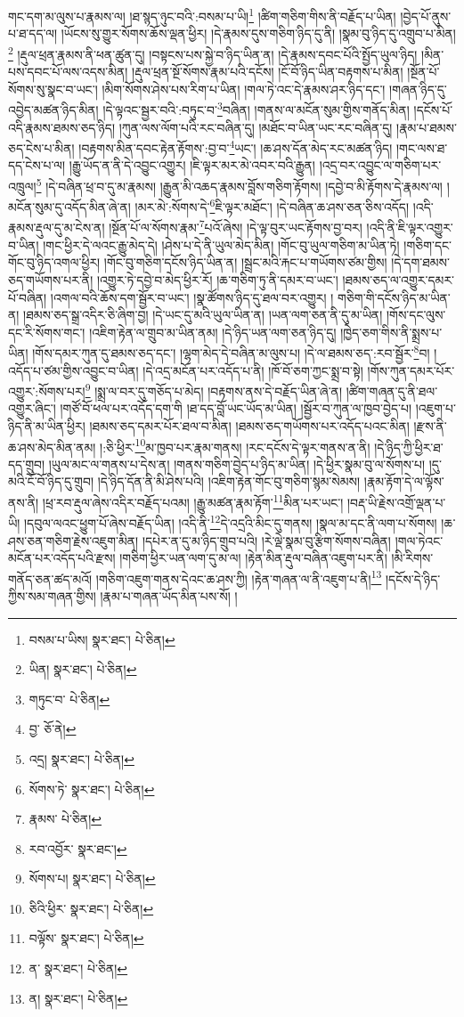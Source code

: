 གང་དག་མ་ལུས་པ་རྣམས་ལ། །ཐ་སྙད་ཉུང་བའི་:བསམ་པ་ཡི།\footnote{བསམ་པ་ཡིས།  སྣར་ཐང་།  པེ་ཅིན། } །ཚིག་གཅིག་གིས་ནི་བརྗོད་པ་ཡིན། །བྱེད་པོ་ནུས་པ་ཐ་དད་ལ། །ཡོངས་སུ་གྱུར་སོགས་ཆོས་ལྡན་ཕྱིར། །དེ་རྣམས་དུས་གཅིག་ཉིད་དུ་ནི། །སྣམ་བུ་ཉིད་དུ་འགྲུབ་པ་མིན།\footnote{ཡིན།  སྣར་ཐང་།  པེ་ཅིན། } །རྡུལ་ཕྲན་རྣམས་ནི་ཕན་ཚུན་དུ། །བསྟངས་པས་སྐྱེ་བ་ཉིད་ཡིན་ན། །དེ་རྣམས་དབང་པོའི་སྤྱོད་ཡུལ་ཉིད། །མིན་པས་དབང་པོ་ལས་འདས་མིན། །རྡུལ་ཕྲན་སྔོ་སོགས་རྣམ་པའི་དངོས། །ངོ་བོ་ཉིད་ཡིན་བརྟགས་པ་མིན། །སྔོན་པོ་སོགས་སུ་སྣང་བ་ཡང་། །མིག་སོགས་ཤེས་པས་རིག་པ་ཡིན། །གལ་ཏེ་འང་དེ་རྣམས་ཤར་ཉིད་དང་། །གཞན་ཉིད་དུ་འབྱེད་མཚན་ཉིད་མིན། །དེ་ལྟའང་སྦྱར་བའི་:བཏུང་བ་\footnote{གཏུང་བ་  པེ་ཅིན། }བཞིན། །གནས་ལ་མངོན་སུམ་གྱིས་གནོད་མིན། །དངོས་པོ་འདི་རྣམས་ཐམས་ཅད་ཉིད། །ཀུན་ལས་ལོག་པའི་རང་བཞིན་དུ། །མཐོང་བ་ཡིན་ཡང་རང་བཞིན་དུ། །རྣམ་པ་ཐམས་ཅད་ངེས་པ་མིན། །བརྟགས་མིན་དབང་རྟེན་རྟོགས་:བྱ་བ་\footnote{བྱ་  ཅོ་ནེ། }ཡང་། །ཆ་ཤས་དོན་མེད་རང་མཚན་ཉིད། །གང་ལས་ཐ་དད་ངེས་པ་ལ། །རྒྱུ་ཡོད་ན་ནི་དེ་འབྱུང་འགྱུར། །ཇི་ལྟར་མར་མེ་འབར་བའི་རྒྱུན། །འདྲ་བར་འབྱུང་ལ་གཅིག་པར་འཁྲུལ།\footnote{འདྲ།  སྣར་ཐང་།  པེ་ཅིན། } །དེ་བཞིན་ཕྲ་བ་དུ་མ་རྣམས། །རྒྱུན་མི་འཆད་རྣམས་བློས་གཅིག་རྟོགས། །དབྱེ་བ་མི་རྟོགས་དེ་རྣམས་ལ། །མངོན་སུམ་དུ་འདོད་མིན་ཞེ་ན། །མར་མེ་:སོགས་དེ་\footnote{སོགས་ཏེ་  སྣར་ཐང་།  པེ་ཅིན། }ཇི་ལྟར་མཐོང་། །དེ་བཞིན་ཆ་ཤས་ཅན་ཅིས་འདོད། །འདི་རྣམས་རྡུལ་དུ་མ་ངེས་ན། །སྔོན་པོ་ལ་སོགས་རྣམ་\footnote{རྣམས་  པེ་ཅིན། }པའོ་ཞེས། །དེ་ལྟ་བུར་ཡང་རྟོགས་བྱ་བར། །འདི་ནི་ཇི་ལྟར་འགྱུར་བ་ཡིན། །གང་ཕྱིར་དེ་ལའང་རྒྱུ་མེད་དེ། །ཤེས་པ་དེ་ནི་ཡུལ་མེད་མིན། །གོང་བུ་ཡུལ་གཅིག་མ་ཡིན་ཏེ། །གཅིག་དང་གོང་བུ་ཉིད་འགལ་ཕྱིར། །གོང་བུ་གཅིག་དངོས་ཉིད་ཡིན་ན། །སྦྲང་མའི་རྐང་པ་གཡོགས་ཙམ་གྱིས། །དེ་དག་ཐམས་ཅད་གཡོགས་པར་ནི། །འགྱུར་ཏེ་དབྱེ་བ་མེད་ཕྱིར་རོ། །ཆ་གཅིག་ཏུ་ནི་དམར་བ་ཡང་། །ཐམས་ཅད་ལ་འགྱུར་དམར་པོ་བཞིན། །འགལ་བའི་ཆོས་དག་སྦྱོར་བ་ཡང་། །སྣ་ཚོགས་ཉིད་དུ་ཐལ་བར་འགྱུར། །
གཅིག་གི་དངོས་ཉིད་མ་ཡིན་ན། །ཐམས་ཅད་སྒྲ་འདིར་ཅི་ཞིག་བྱ། །དེ་ཡང་དུ་མའི་ཡུལ་ཡིན་ན། །ཡན་ལག་ཅན་ནི་དུ་མ་ཡིན། །གོས་དང་ལུས་དང་རི་སོགས་གང་། །འཇིག་རྟེན་ལ་གྲུབ་མ་ཡིན་ནམ། །དེ་ཉིད་ཡན་ལག་ཅན་ཉིད་དུ། །ཁྱེད་ཅག་གིས་ནི་སྨྲས་པ་ཡིན། །གོས་དམར་ཀུན་དུ་ཐམས་ཅད་དང་། །ལྷག་མེད་དེ་བཞིན་མ་ལུས་པ། །དེ་ལ་ཐམས་ཅད་:རབ་སྦྱོར་\footnote{རབ་འབྱོར་  སྣར་ཐང་། }བ། །འདོད་པ་ཙམ་གྱིས་འབྱུང་བ་ཡིན། །དེ་འདྲ་མངོན་པར་འདོད་པ་ནི། །ཁོ་བོ་ཅག་ཀྱང་སྨྲ་བ་སྟེ། །གོས་ཀུན་དམར་པོར་འགྱུར་:སོགས་པར།\footnote{སོགས་པ།  སྣར་ཐང་།  པེ་ཅིན། } །སྨྲ་ལ་བར་དུ་གཅོད་པ་མེད། །བརྟགས་ནས་དེ་བརྗོད་ཡིན་ཞེ་ན། །ཚིག་གཞན་དུ་ནི་ཐལ་འགྱུར་ཞིང་། །གཙོ་བོ་ཕལ་པར་འདོད་དག་གི །ཐ་དད་བློ་ཡང་ཡོད་མ་ཡིན། །སྦྱོར་བ་ཀུན་ལ་ཁྱབ་བྱེད་པ། །འཇུག་པ་ཉིད་ནི་མ་ཡིན་ཕྱིར། །ཐམས་ཅད་དམར་པོར་ཐལ་བ་མིན། །ཐམས་ཅད་གཡོགས་པར་འདོད་པའང་མིན། །རྫས་ནི་ཆ་ཤས་མེད་མིན་ནམ། །:ཅི་ཕྱིར་\footnote{ཅིའི་ཕྱིར་  སྣར་ཐང་།  པེ་ཅིན། }མ་ཁྱབ་པར་རྣམ་གནས། །རང་དངོས་དེ་ལྟར་གནས་ན་ནི། །དེ་ཉིད་ཀྱི་ཕྱིར་ཐ་དད་གྲུབ། །ཡུལ་མང་ལ་གནས་པ་དེས་ན། །གནས་གཅིག་བྱེད་པ་ཉིད་མ་ཡིན། །དེ་ཕྱིར་སྣམ་བུ་ལ་སོགས་པ། །དུ་མའི་ངོ་བོ་ཉིད་དུ་གྲུབ། །དེ་ཉིད་དོན་ནི་མི་ཤེས་པའི། །འཇིག་རྟེན་གོང་བུ་གཅིག་སྙམ་སེམས། །རྣམ་རྟོག་དེ་ལ་ལྟོས་ནས་ནི། །ཕྲ་རབ་རྡུལ་ཞེས་འདིར་བརྗོད་པའམ། །རྒྱུ་མཚན་རྣམ་རྟོག་\footnote{བལྟོས་  སྣར་ཐང་།  པེ་ཅིན། }མིན་པར་ཡང་། །བརྡ་ཡི་རྗེས་འགྲོ་ལྡན་པ་ཡི། །དབུལ་ལའང་ཕྱུག་པོ་ཞེས་བརྗོད་ཡིན། །འདི་ནི་\footnote{ན་  སྣར་ཐང་།  པེ་ཅིན། }དེ་འདྲའི་མིང་དུ་གནས། །སྣལ་མ་དང་ནི་ལག་པ་སོགས། །ཆ་ཤས་ཅན་གཅིག་རྗེས་འཇུག་མིན། །དཔེར་ན་དུ་མ་ཉིད་གྲུབ་པའི། །རེ་ལྡེ་སྣམ་བུ་རྩིག་སོགས་བཞིན། །གལ་ཏེའང་མངོན་པར་འདོད་པའི་རྫས། །གཅིག་ཕྱིར་ཡན་ལག་དུ་མ་ལ། །རྟེན་མིན་རྡུལ་བཞིན་འཇུག་པར་ནི། །མི་རིགས་གནོད་ཅན་ཚད་མའོ། །གཅིག་འཇུག་གནས་དེའང་ཆ་ཤས་ཀྱི། །རྟེན་གཞན་ལ་ནི་འཇུག་པ་ནི།\footnote{ན།  སྣར་ཐང་།  པེ་ཅིན། } །དངོས་དེ་ཉིད་ཀྱིས་སམ་གཞན་གྱིས། །རྣམ་པ་གཞན་ཡོད་མིན་པས་སོ། །
